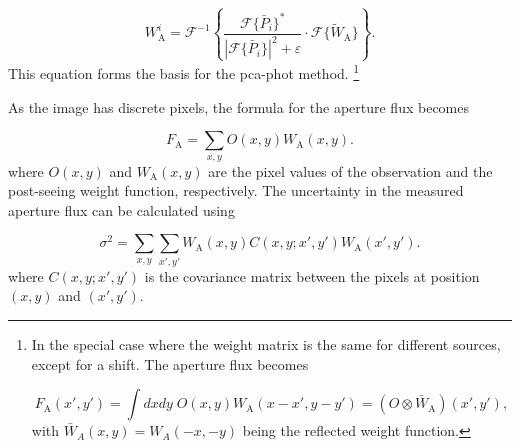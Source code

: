 \begin{equation}\label{eq: numerical deconvolution}
    W^i_\mathrm{A} = \mathcal{F}^{-1}\left\{\frac{\mathcal{F}\{\bar{P}_i\}^*}{|\mathcal{F}\{\bar{P}_i\}|^2+\varepsilon}\cdot\mathcal{F}\{\tilde{W}_\mathrm{A}\}\right\}.
\end{equation}
This equation forms the basis for the \gls{pca-phot} method. \footnote{In the special case where the weight matrix is the same for different sources, except for a shift. The aperture flux becomes 

\begin{equation}
    F_\mathrm{A}(x',y') = \int dxdy\;O(x,y)W_\mathrm{A}(x-x',y-y') = (O \otimes \bar{W}_\mathrm{A})(x',y'),
\end{equation}
with $\bar{W}_A(x,y)=W_A(-x,-y)$ being the reflected weight function.}

\noindent As the image has discrete pixels, the formula for the aperture flux becomes

\begin{equation}\label{eq: flux}
    F_\mathrm{A} = \sum_{x,y}O(x,y)W_\mathrm{A}(x,y).
\end{equation}
where $O(x,y)$ and $W_\mathrm{A}(x,y)$ are the pixel values of the observation and the post-seeing weight function, respectively. The uncertainty in the measured aperture flux can be calculated using

\begin{equation}\label{eq: variance}
    \sigma^2 = \sum_{x,y}\sum_{x',y'}W_\mathrm{A}(x,y)C(x,y;x',y')W_\mathrm{A}(x',y').
\end{equation}
where $C(x,y;x',y')$ is the covariance matrix between the pixels at position $(x,y)$ and $(x',y')$.



